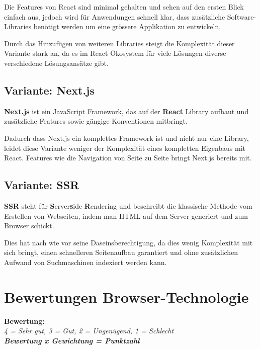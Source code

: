 Die Features von React sind minimal gehalten und sehen auf den ersten Blick
einfach aus, jedoch wird für Anwendungen schnell klar, dass zusätzliche
Software-Libraries benötigt werden um eine grössere Applikation zu entwickeln.

Durch das Hinzufügen von weiteren Libraries steigt die Komplexität dieser
Variante stark an, da es im React Ökosystem für viele Lösungen diverse
verschiedene Lösungsansätze gibt.

\subsection{Variante: Next.js}

\textbf{Next.js} ist ein JavaScript Framework, das auf der \textbf{React}
Library aufbaut und zusätzliche Features sowie gängige Konventionen mitbringt.

Dadurch dass Next.js ein komplettes Framework ist und nicht nur eine Library,
leidet diese Variante weniger der Komplexität eines kompletten Eigenbaus mit
React. Features wie die Navigation von Seite zu Seite bringt Next.js bereits
mit.

\subsection{Variante: SSR}

\textbf{SSR} steht für \textbf{S}erver\textbf{s}ide \textbf{R}endering und
beschreibt die klassische Methode vom Erstellen von Webseiten, indem man HTML
auf dem Server generiert und zum Browser schickt.

Dies hat nach wie vor seine Daseinsberechtigung, da dies wenig Komplexität
mit sich bringt, einen schnelleren Seitenaufbau garantiert und ohne
zusätzlichen Aufwand von Suchmaschinen indexiert werden kann.

\clearpage
\section{Bewertungen Browser-Technologie}\label{bewertungen-browser-technologie}

\textbf{Bewertung:}\\
\textit{4 = Sehr gut, 3 = Gut, 2 = Ungenügend, 1 = Schlecht}\\


\textbf{\textit{Bewertung x Gewichtung = Punktzahl}}

